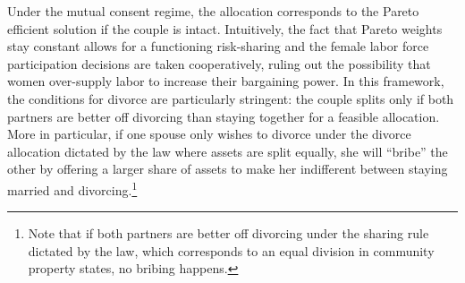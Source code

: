 \documentclass[12pt]{article}
\numberwithin{table}{section}
\begin{document}
 Under the mutual consent regime, the allocation corresponds to the Pareto efficient solution if the couple is intact. Intuitively, the fact that Pareto weights stay constant allows for a functioning risk-sharing and the female labor force participation decisions are taken cooperatively, ruling out the possibility that women over-supply labor to increase their bargaining power. In this framework, the conditions for divorce are particularly stringent: the couple splits only if both partners are better off divorcing than staying together for a feasible allocation. More in particular, if one spouse only wishes to divorce under the divorce allocation dictated by the law where assets are split equally, she will ``bribe'' the other by offering a larger share of assets to make her indifferent between staying married and divorcing.\footnote{Note that if both partners are better off divorcing under the sharing rule dictated by the law, which corresponds to an equal division in community property states, no bribing happens.}
\end{document}

